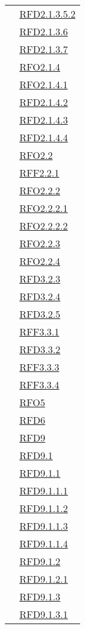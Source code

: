 \begin{longtable}{|>{\centering}m{5cm}|m{5cm}<{\centering}|}
& \hyperlink{RFD2.1.3.5.2}{RFD2.1.3.5.2}\\
& \hyperlink{RFD2.1.3.6}{RFD2.1.3.6}\\
& \hyperlink{RFD2.1.3.7}{RFD2.1.3.7}\\
& \hyperlink{RFO2.1.4}{RFO2.1.4}\\
& \hyperlink{RFO2.1.4.1}{RFO2.1.4.1}\\
& \hyperlink{RFD2.1.4.2}{RFD2.1.4.2}\\
& \hyperlink{RFD2.1.4.3}{RFD2.1.4.3}\\
& \hyperlink{RFD2.1.4.4}{RFD2.1.4.4}\\
& \hyperlink{RFO2.2}{RFO2.2}\\
& \hyperlink{RFF2.2.1}{RFF2.2.1}\\
& \hyperlink{RFO2.2.2}{RFO2.2.2}\\
& \hyperlink{RFO2.2.2.1}{RFO2.2.2.1}\\
& \hyperlink{RFO2.2.2.2}{RFO2.2.2.2}\\
& \hyperlink{RFO2.2.3}{RFO2.2.3}\\
& \hyperlink{RFO2.2.4}{RFO2.2.4}\\
& \hyperlink{RFD3.2.3}{RFD3.2.3}\\
& \hyperlink{RFD3.2.4}{RFD3.2.4}\\
& \hyperlink{RFD3.2.5}{RFD3.2.5}\\
& \hyperlink{RFF3.3.1}{RFF3.3.1}\\
& \hyperlink{RFD3.3.2}{RFD3.3.2}\\
& \hyperlink{RFF3.3.3}{RFF3.3.3}\\
& \hyperlink{RFF3.3.4}{RFF3.3.4}\\
& \hyperlink{RFO5}{RFO5}\\
& \hyperlink{RFD6}{RFD6}\\
& \hyperlink{RFD9}{RFD9}\\
& \hyperlink{RFD9.1}{RFD9.1}\\
& \hyperlink{RFD9.1.1}{RFD9.1.1}\\
& \hyperlink{RFD9.1.1.1}{RFD9.1.1.1}\\
& \hyperlink{RFD9.1.1.2}{RFD9.1.1.2}\\
& \hyperlink{RFD9.1.1.3}{RFD9.1.1.3}\\
& \hyperlink{RFD9.1.1.4}{RFD9.1.1.4}\\
& \hyperlink{RFD9.1.2}{RFD9.1.2}\\
& \hyperlink{RFD9.1.2.1}{RFD9.1.2.1}\\
& \hyperlink{RFD9.1.3}{RFD9.1.3}\\
& \hyperlink{RFD9.1.3.1}{RFD9.1.3.1}\\

\end{longtable}

